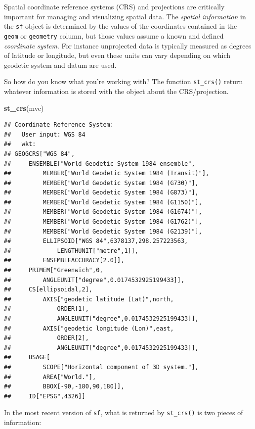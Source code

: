 \documentclass[
]{book}
\newenvironment{Shaded}{\begin{snugshade}}{\end{snugshade}}
\newcommand{\FunctionTok}[1]{\textcolor[rgb]{0.13,0.29,0.53}{\textbf{#1}}}
\newcommand{\NormalTok}[1]{#1}
\begin{document}
Spatial coordinate reference systems (CRS) and projections are critically important for managing and visualizing spatial data. The \emph{spatial information} in the \texttt{sf} object is determined by the values of the coordinates contained in the \texttt{geom} or \texttt{geometry} column, but those values assume a known and defined \emph{coordinate system}. For instance unprojected data is typically measured as degrees of latitude or longitude, but even these units can vary depending on which geodetic system and datum are used.

So how do you know what you're working with? The function \texttt{st\_crs()} return whatever information is stored with the object about the CRS/projection.

\begin{Shaded}
\begin{Highlighting}[]
\FunctionTok{st\_crs}\NormalTok{(mvc)}
\end{Highlighting}
\end{Shaded}

\begin{verbatim}
## Coordinate Reference System:
##   User input: WGS 84 
##   wkt:
## GEOGCRS["WGS 84",
##     ENSEMBLE["World Geodetic System 1984 ensemble",
##         MEMBER["World Geodetic System 1984 (Transit)"],
##         MEMBER["World Geodetic System 1984 (G730)"],
##         MEMBER["World Geodetic System 1984 (G873)"],
##         MEMBER["World Geodetic System 1984 (G1150)"],
##         MEMBER["World Geodetic System 1984 (G1674)"],
##         MEMBER["World Geodetic System 1984 (G1762)"],
##         MEMBER["World Geodetic System 1984 (G2139)"],
##         ELLIPSOID["WGS 84",6378137,298.257223563,
##             LENGTHUNIT["metre",1]],
##         ENSEMBLEACCURACY[2.0]],
##     PRIMEM["Greenwich",0,
##         ANGLEUNIT["degree",0.0174532925199433]],
##     CS[ellipsoidal,2],
##         AXIS["geodetic latitude (Lat)",north,
##             ORDER[1],
##             ANGLEUNIT["degree",0.0174532925199433]],
##         AXIS["geodetic longitude (Lon)",east,
##             ORDER[2],
##             ANGLEUNIT["degree",0.0174532925199433]],
##     USAGE[
##         SCOPE["Horizontal component of 3D system."],
##         AREA["World."],
##         BBOX[-90,-180,90,180]],
##     ID["EPSG",4326]]
\end{verbatim}

In the most recent version of \texttt{sf}, what is returned by \texttt{st\_crs()} is two pieces of information:
\end{document}

